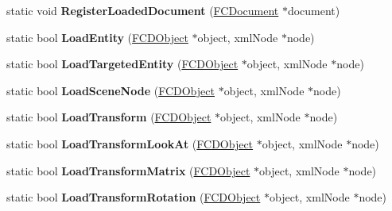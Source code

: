 \begin{DoxyCompactItemize}
\item 
\hypertarget{classFArchiveXML_a114e99422f7d398d7f59b21439cebe9e}{
static void {\bfseries RegisterLoadedDocument} (\hyperlink{classFCDocument}{FCDocument} $\ast$document)}
\label{classFArchiveXML_a114e99422f7d398d7f59b21439cebe9e}

\item 
\hypertarget{classFArchiveXML_a44ed8a9ade24b76a36fa20f875d31afc}{
static bool {\bfseries LoadEntity} (\hyperlink{classFCDObject}{FCDObject} $\ast$object, xmlNode $\ast$node)}
\label{classFArchiveXML_a44ed8a9ade24b76a36fa20f875d31afc}

\item 
\hypertarget{classFArchiveXML_ada4170520a4eb94ea5259c952c48c69b}{
static bool {\bfseries LoadTargetedEntity} (\hyperlink{classFCDObject}{FCDObject} $\ast$object, xmlNode $\ast$node)}
\label{classFArchiveXML_ada4170520a4eb94ea5259c952c48c69b}

\item 
\hypertarget{classFArchiveXML_a487520c0383bf2beccbe4ed9b47ea358}{
static bool {\bfseries LoadSceneNode} (\hyperlink{classFCDObject}{FCDObject} $\ast$object, xmlNode $\ast$node)}
\label{classFArchiveXML_a487520c0383bf2beccbe4ed9b47ea358}

\item 
\hypertarget{classFArchiveXML_aca9add5b61e4ccc0e22be9a2038b4352}{
static bool {\bfseries LoadTransform} (\hyperlink{classFCDObject}{FCDObject} $\ast$object, xmlNode $\ast$node)}
\label{classFArchiveXML_aca9add5b61e4ccc0e22be9a2038b4352}

\item 
\hypertarget{classFArchiveXML_a1169d63ba7a5e2afec67d3582f3093e1}{
static bool {\bfseries LoadTransformLookAt} (\hyperlink{classFCDObject}{FCDObject} $\ast$object, xmlNode $\ast$node)}
\label{classFArchiveXML_a1169d63ba7a5e2afec67d3582f3093e1}

\item 
\hypertarget{classFArchiveXML_a11bf1d14aa206adfd006733ad7e5015a}{
static bool {\bfseries LoadTransformMatrix} (\hyperlink{classFCDObject}{FCDObject} $\ast$object, xmlNode $\ast$node)}
\label{classFArchiveXML_a11bf1d14aa206adfd006733ad7e5015a}

\item 
\hypertarget{classFArchiveXML_a446646e0da33d48808c83018dfc9efdf}{
static bool {\bfseries LoadTransformRotation} (\hyperlink{classFCDObject}{FCDObject} $\ast$object, xmlNode $\ast$node)}
\label{classFArchiveXML_a446646e0da33d48808c83018dfc9efdf}


\end{DoxyCompactItemize}
